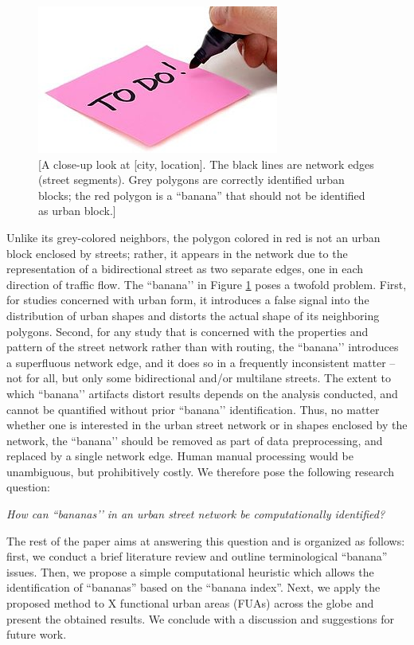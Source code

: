 \begin{figure}
    \centering
    \includegraphics{figures/todop}
    \caption{[A close-up look at [city, location]. The black lines are network edges (street segments). Grey polygons are correctly identified urban blocks; the red polygon is a ``banana'' that should not be identified as urban block.]}
    \label{fig:01}
\end{figure}

Unlike its grey-colored neighbors, the polygon colored in red is not an urban block enclosed by streets; rather, it appears in the network due to the representation of a bidirectional street as two separate edges, one in each direction of traffic flow. The ``banana’’ in Figure \ref{fig:01} poses a twofold problem. First, for studies concerned with urban form, it introduces a false signal into the distribution of urban shapes and distorts the actual shape of its neighboring polygons. Second, for any study that is concerned with the properties and pattern of the street network rather than with routing, the ``banana’’ introduces a superfluous network edge, and it does so in a frequently inconsistent matter – not for all, but only some bidirectional and/or multilane streets. The extent to which ``banana’’ artifacts distort results depends on the analysis conducted, and cannot be quantified without prior ``banana’’ identification. Thus, no matter whether one is interested in the urban street network or in shapes enclosed by the network, the ``banana’’ should be removed as part of data preprocessing, and replaced by a single network edge. Human manual processing would be unambiguous, but prohibitively costly. We therefore pose the following research question:

\begin{center}
\textit{How can ``bananas’’ in an urban street network be computationally identified?}
\end{center}

The rest of the paper aims at answering this question and is organized as follows: first, we conduct a brief literature review and outline terminological ``banana'' issues. Then, we propose a simple computational heuristic which allows the identification of ``bananas'' based on the ``banana index''. Next, we apply the proposed method to X functional urban areas (FUAs) across the globe and present the obtained results. We conclude with a discussion and suggestions for future work.

